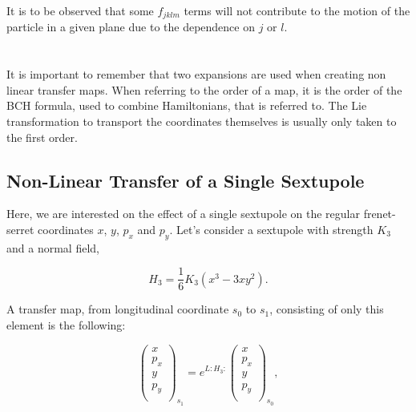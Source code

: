 It is to be observed that some $f_{jklm}$ terms will not contribute to the motion of the particle 
in a given plane due to the dependence on $j$ or $l$.



\section{}
\label{subsection:coordinate_systems:example_of_maps}

It is important to remember that two expansions are used when creating non linear transfer maps.
When referring to the order of a map, it is the order of the BCH formula, used to combine
Hamiltonians, that is referred to.
The Lie transformation to transport the coordinates themselves is usually only taken to the first
order.

\subsection{Non-Linear Transfer of a Single Sextupole}

Here, we are interested on the effect of a single sextupole on the regular frenet-serret coordinates
$x$, $y$, $p_x$ and $p_y$.
Let's consider a sextupole with strength $K_3$ and a normal field,

\begin{equation}
    H_3 = \frac{1}{6} K_3 (x^3 - 3xy^2).
\end{equation}

A transfer map, from longitudinal coordinate $s_0$ to $s_1$, consisting of only this element is the
following:

\begin{equation}
    \begin{pmatrix}
        x \\
        p_x \\
        y \\
        p_y \\
    \end{pmatrix}_{s_1}
    =
    e^{L:H_3:}
    \begin{pmatrix}
        x \\
        p_x \\
        y \\
        p_y \\
    \end{pmatrix}_{s_0},
    \label{eq:coordinate_systems:single_sextupole_lie_transfer}
\end{equation}

